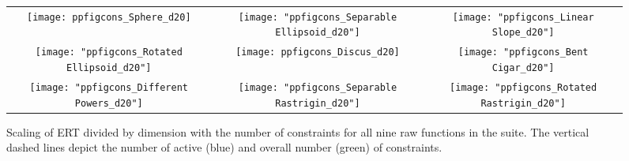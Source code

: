 \documentclass[sigconf]{acmart}
\begin{document}
{%

\begin{figure*}
 \begin{tabular}{@{}c@{}c@{}c@{}}
 \texttt{[image: ppfigcons\_Sphere\_d20]} & 
 \texttt{[image: "ppfigcons\_Separable Ellipsoid\_d20"]} &
 \texttt{[image: "ppfigcons\_Linear Slope\_d20"]}\\
 \texttt{[image: "ppfigcons\_Rotated Ellipsoid\_d20"]} & 
 \texttt{[image: ppfigcons\_Discus\_d20]} &
 \texttt{[image: "ppfigcons\_Bent Cigar\_d20"]}\\ 
 \texttt{[image: "ppfigcons\_Different Powers\_d20"]} & 
 \texttt{[image: "ppfigcons\_Separable Rastrigin\_d20"]} &
 \texttt{[image: "ppfigcons\_Rotated Rastrigin\_d20"]}\\ 
 \end{tabular}
\caption{
\label{fig:scalingconstraints20D}
Scaling of ERT divided by dimension with the number of constraints for all nine raw functions in the \bbobcons suite. The vertical dashed lines depict the number of active (blue) and overall number (green) of constraints.
}
\end{figure*}







}
\end{document}
